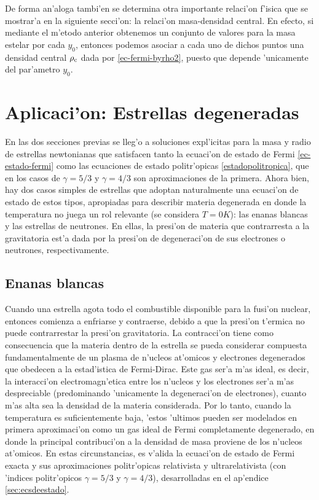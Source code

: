 De forma an'aloga tambi'en se determina otra importante relaci'on f'isica que se mostrar'a en la siguiente secci'on: la relaci'on masa-densidad central. En efecto, si mediante el m'etodo anterior obtenemos un conjunto de valores para la masa estelar por cada $y_0$, entonces podemos asociar a cada uno de dichos puntos una densidad central $\rho_{\rm c}$ dada por \eqref{ec-fermi-byrho2}, puesto que depende 'unicamente del par'ametro $y_0$.


\section{Aplicaci'on: Estrellas degeneradas}
En las dos secciones previas se lleg'o a soluciones expl'icitas para la masa y radio de estrellas newtonianas que satisfacen tanto la ecuaci'on de estado de Fermi \eqref{ec-estado-fermi} como las ecuaciones de estado politr'opicas \eqref{estadopolitropica}, que en los casos de $\gamma=5/3$ y $\gamma=4/3$ son aproximaciones de la primera. Ahora bien, hay dos casos simples de estrellas que adoptan naturalmente una ecuaci'on de estado de estos tipos, apropiadas para describir materia degenerada en donde la temperatura no juega un rol relevante (se considera $T=0 K$): las enanas blancas y las estrellas de neutrones. En ellas, la presi'on de materia que contrarresta a la gravitatoria est'a dada por la presi'on de degeneraci'on de sus electrones o neutrones, respectivamente.


\subsection{Enanas blancas}\label{sec:enanasblancas}
Cuando una estrella agota todo el combustible disponible para la fusi'on nuclear, entonces comienza a enfriarse y contraerse, debido a que la presi'on t'ermica no puede contrarrestar la presi'on gravitatoria. La contracci'on tiene como consecuencia que la materia dentro de la estrella se pueda considerar compuesta fundamentalmente de un plasma de n'ucleos at'omicos y electrones degenerados que obedecen a la estad'istica de Fermi-Dirac. Este gas ser'a m'as ideal, es decir, la interacci'on electromagn'etica entre los n'ucleos y los electrones ser'a m'as despreciable (predominando 'unicamente la degeneraci'on de electrones), cuanto m'as alta sea la densidad de la materia considerada. Por lo tanto, cuando la temperatura es suficientemente baja, 'estos 'ultimos pueden ser modelados en primera aproximaci'on como un gas ideal de Fermi completamente degenerado, en donde la principal contribuci'on a la densidad de masa proviene de los n'ucleos at'omicos. En estas circunstancias, es v'alida la ecuaci'on de estado de Fermi exacta y sus aproximaciones politr'opicas  relativista y ultrarelativista (con 'indices politr'opicos $\gamma=5/3$ y $\gamma=4/3$), desarrolladas en el ap'endice \ref{sec:ecsdeestado}.

